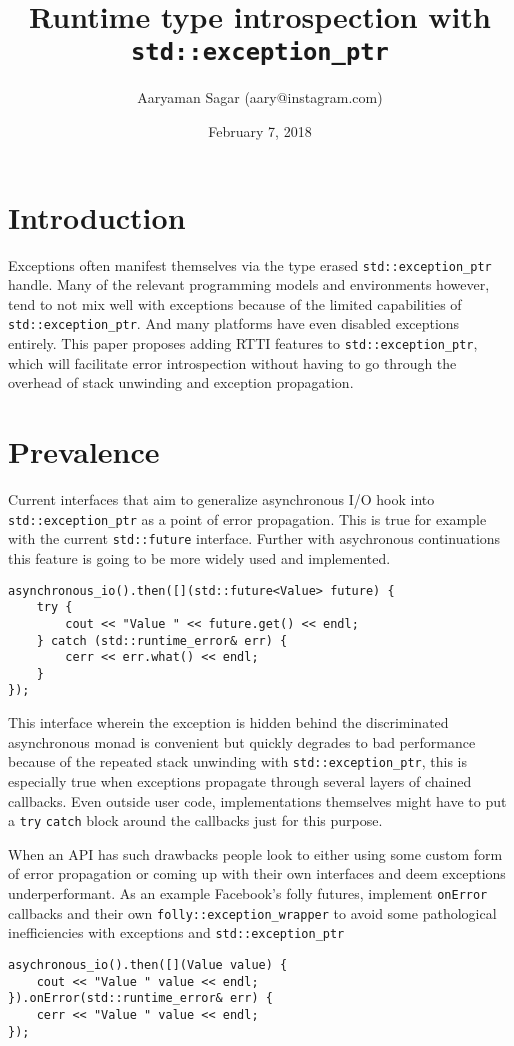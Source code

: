 \documentclass{article}
\begin{document}
\title{\textbf{Runtime type introspection with \texttt{std::exception\_ptr}}}
\author{Aaryaman Sagar (aary@instagram.com)}
\date{February 7, 2018}
\maketitle

\section{Introduction}
Exceptions often manifest themselves via the type erased
\texttt{std::exception\_ptr} handle.  Many of the relevant programming models
and environments however, tend to not mix well with exceptions because of the
limited capabilities of \texttt{std::exception\_ptr}.  And many platforms have
even disabled exceptions entirely.  This paper proposes adding RTTI features
to \texttt{std::exception\_ptr}, which will facilitate error introspection
without having to go through the overhead of stack unwinding and exception
propagation.

\section{Prevalence}
Current interfaces that aim to generalize asynchronous I/O hook into
\texttt{std::exception\_ptr} as a point of error propagation.  This is true
for example with the current \texttt{std::future} interface.  Further with
asychronous continuations this feature is going to be more widely used and
implemented.
\begin{lstlisting}
asynchronous_io().then([](std::future<Value> future) {
    try {
        cout << "Value " << future.get() << endl;
    } catch (std::runtime_error& err) {
        cerr << err.what() << endl;
    }
});
\end{lstlisting}
This interface wherein the exception is hidden behind the discriminated
asynchronous monad is convenient but quickly degrades to bad performance
because of the repeated stack unwinding with \texttt{std::exception\_ptr},
this is especially true when exceptions propagate through several layers of
chained callbacks.  Even outside user code, implementations themselves might
have to put a \texttt{try} \texttt{catch} block around the callbacks just for
this purpose.

When an API has such drawbacks people look to either using some custom form of
error propagation or coming up with their own interfaces and deem exceptions
underperformant.  As an example Facebook's folly futures, implement
\texttt{onError} callbacks and their own \texttt{folly::exception\_wrapper} to
avoid some pathological inefficiencies with exceptions and
\texttt{std::exception\_ptr}
\begin{lstlisting}
asychronous_io().then([](Value value) {
    cout << "Value " value << endl;
}).onError(std::runtime_error& err) {
    cerr << "Value " value << endl;
});
\end{lstlisting}
\end{document}

